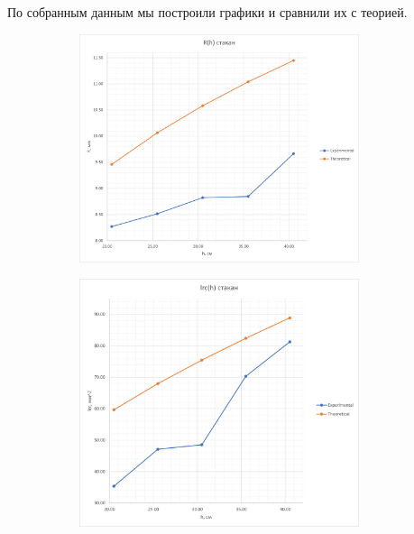 \documentclass[a4paper, 12pt]{article}
\begin{document}
По собранным данным мы построили графики и сравнили их с теорией.

\begin{figure}[H]
    \begin{subfigure}{0.5\textwidth}
        \includegraphics[width=0.9\textwidth]{img/R(h) стакан.png}
    \end{subfigure}%
    \begin{subfigure}{0.5\textwidth}
        \includegraphics[width=0.9\textwidth]{img/lrc(h) стакан.png}
    \end{subfigure}
\end{figure}
\end{document}

